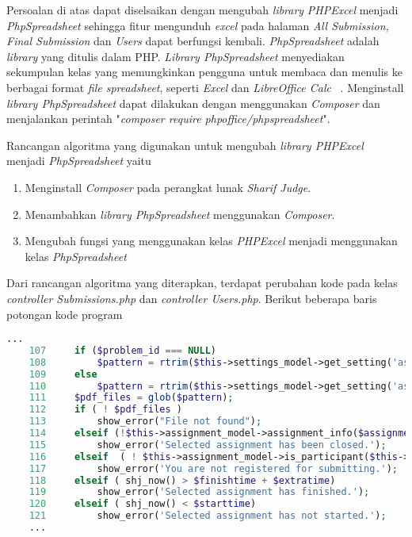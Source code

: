 	Persoalan di atas dapat diselsaikan dengan mengubah \textit{library} \textit{PHPExcel} menjadi \textit{PhpSpreadsheet} sehingga fitur mengunduh \textit{excel} pada halaman \textit{All Submission, Final Submission} dan \textit{Users} dapat berfungsi kembali. \textit{PhpSpreadsheet} adalah \textit{library} yang ditulis dalam PHP. \textit{Library PhpSpreadsheet} menyediakan sekumpulan kelas yang memungkinkan pengguna untuk membaca dan menulis ke berbagai format \textit{file spreadsheet}, seperti \textit{Excel} dan \textit{LibreOffice Calc} ~\cite{phpoffice:10:phpspreadsheet}. Menginstall \textit{library PhpSpreadsheet} dapat dilakukan dengan menggunakan \textit{Composer} dan menjalankan perintah "\textit{composer require phpoffice/phpspreadsheet}".
	
	Rancangan algoritma yang digunakan untuk mengubah \textit{library PHPExcel} menjadi \textit{PhpSpreadsheet} yaitu
	\begin{enumerate}
		\item Menginstall \textit{Composer} pada perangkat lunak \textit{Sharif Judge}.
		\item Menambahkan \textit{library PhpSpreadsheet} menggunakan \textit{Composer}.
		\item Mengubah fungsi yang menggunakan kelas \textit{PHPExcel} menjadi menggunakan kelas \textit{PhpSpreadsheet}
	\end{enumerate}
	
	Dari rancangan algoritma yang diterapkan, terdapat perubahan kode pada kelas \textit{controller Submissions.php} dan \textit{controller Users.php}. Berikut beberapa baris potongan kode program
	
	\begin{lstlisting}[language=PHP, basicstyle=\ttfamily, frame=single,
	columns=fullflexible, keepspaces=true, breaklines=true]
	...
	107		if ($problem_id === NULL)
	108			$pattern = rtrim($this->settings_model->get_setting('assignments_root'),'/')."/assignment_{$assignment_id}/*.pdf";
	109		else
	110			$pattern = rtrim($this->settings_model->get_setting('assignments_root'),'/')."/assignment_{$assignment_id}/p{$problem_id}/*.pdf";
	111		$pdf_files = glob($pattern);
	112		if ( ! $pdf_files )
	113			show_error("File not found");
	114		elseif (!$this->assignment_model->assignment_info($assignment_id)['open'])
	115			show_error('Selected assignment has been closed.');
	116		elseif	( ! $this->assignment_model->is_participant($this->assignment_model->assignment_info($assignment_id)['participants'],$this->user->username) )
	117			show_error('You are not registered for submitting.');
	118		elseif ( shj_now() > $finishtime + $extratime)
	119			show_error('Selected assignment has finished.');
	120		elseif ( shj_now() < $starttime)
	121			show_error('Selected assignment has not started.');
	...
	\end{lstlisting}
	